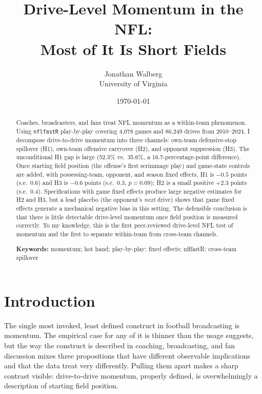 \documentclass[11pt]{article}
\title{Drive-Level Momentum in the NFL: \\
       \large Most of It Is Short Fields}
\author{Jonathan Walberg\\University of Virginia}
\date{\today}
\begin{document}
\maketitle

\begin{abstract}
\noindent Coaches, broadcasters, and fans treat NFL momentum as a within-team
phenomenon. Using \texttt{nflfastR} play-by-play covering 4{,}078 games and
86{,}249 drives from 2010--2024, I decompose drive-to-drive momentum into
three channels: own-team defensive-stop spillover (H1), own-team offensive
carryover (H2), and opponent suppression (H3). The unconditional H1 gap is
large (52.3\% vs.\ 35.6\%, a 16.7-percentage-point difference). Once starting
field position (the offense's first scrimmage play) and game-state controls
are added, with possessing-team, opponent, and season fixed effects, H1 is
$-0.5$ points (s.e.\ 0.6) and H3 is $-0.6$ points (s.e.\ 0.3, $p=0.09$);
H2 is a small positive $+2.3$ points (s.e.\ 0.4). Specifications with game
fixed effects produce large negative estimates for H2 and H3, but a lead
placebo (the opponent's \emph{next} drive) shows that game fixed effects
generate a mechanical negative bias in this setting. The defensible
conclusion is that there is little detectable drive-level momentum once
field position is measured correctly. To my knowledge,
this is the first peer-reviewed drive-level NFL test of momentum and the
first to separate within-team from cross-team channels.

\medskip
\noindent\textbf{Keywords:} momentum; hot hand; play-by-play; fixed effects;
nflfastR; cross-team spillover
\end{abstract}

\section{Introduction}

The single most invoked, least defined construct in football broadcasting is
momentum. The empirical case for any of it is thinner than the usage suggests,
but the way the construct is described in coaching, broadcasting, and fan
discussion mixes three propositions that have different observable
implications and that the data treat very differently. Pulling them apart
makes a sharp contrast visible: drive-to-drive momentum, properly defined,
is overwhelmingly a description of starting field position.
\end{document}

